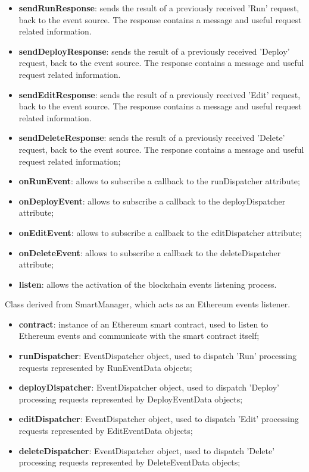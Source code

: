	\begin{itemize}
		\item \textbf{sendRunResponse}: sends the result of a previously received 'Run' request, back to the event source. The response contains a message and useful request related information.
		\item \textbf{sendDeployResponse}: sends the result of a previously received 'Deploy' request, back to the event source. The response contains a message and useful request related information.
		\item \textbf{sendEditResponse}: sends the result of a previously received 'Edit' request, back to the event source. The response contains a message and useful request related information.
		\item \textbf{sendDeleteResponse}: sends the result of a previously received 'Delete' request, back to the event source. The response contains a message and useful request related information;
		\item \textbf{onRunEvent}: allows to subscribe a callback to the runDispatcher attribute;
		\item \textbf{onDeployEvent}: allows to subscribe a callback to the deployDispatcher attribute;
		\item \textbf{onEditEvent}: allows to subscribe a callback to the editDispatcher attribute;
		\item \textbf{onDeleteEvent}: allows to subscribe a callback to the deleteDispatcher attribute;
		\item \textbf{listen}: allows the activation of the blockchain events listening process.
	\end{itemize}
	Class derived from SmartManager, which acts as an Ethereum events listener.
	\begin{itemize}
		\item \textbf{contract}: instance of an Ethereum smart contract, used to listen to Ethereum events and communicate with the smart contract itself;
		\item \textbf{runDispatcher}: EventDispatcher object, used to dispatch 'Run' processing requests represented by RunEventData objects;
		\item \textbf{deployDispatcher}: EventDispatcher object, used to dispatch 'Deploy' processing requests represented by DeployEventData objects;
		\item \textbf{editDispatcher}: EventDispatcher object, used to dispatch 'Edit' processing requests represented by EditEventData objects;
		\item \textbf{deleteDispatcher}: EventDispatcher object, used to dispatch 'Delete' processing requests represented by DeleteEventData objects;
	\end{itemize}

